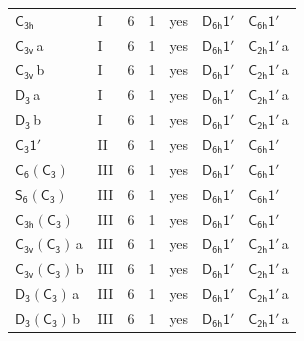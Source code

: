 \documentclass[10pt,a4paper]{article}
\numberwithin{equation}{section}
\newcommand{\grp}[1]{\mathsf{#1}}
\newcommand{\clsletter}[1]{\,{\scriptsize\color{black!55}#1}}
\begin{document}
{\begin{longtable}{@{}llrrlll@{}}
\href{../../../rotation/data/pdf/C3h.pdf}{$\grp{C_{3h}}$} & I & 6 & 1 & yes & \href{D6h-1p.pdf}{$\grp{D_{6h}1'}$} & \href{C6h-1p.pdf}{$\grp{C_{6h}1'}$}\\
\href{../../../rotation/data/pdf/C3v.pdf}{$\grp{C_{3v}}$}\clsletter{a} & I & 6 & 1 & yes & \href{D6h-1p.pdf}{$\grp{D_{6h}1'}$} & \href{C2h-1p.pdf}{$\grp{C_{2h}1'}$}\clsletter{a}\\
\href{../../../rotation/data/pdf/C3v.pdf}{$\grp{C_{3v}}$}\clsletter{b} & I & 6 & 1 & yes & \href{D6h-1p.pdf}{$\grp{D_{6h}1'}$} & \href{C2h-1p.pdf}{$\grp{C_{2h}1'}$}\clsletter{a}\\
\href{../../../rotation/data/pdf/D3.pdf}{$\grp{D_{3}}$}\clsletter{a} & I & 6 & 1 & yes & \href{D6h-1p.pdf}{$\grp{D_{6h}1'}$} & \href{C2h-1p.pdf}{$\grp{C_{2h}1'}$}\clsletter{a}\\
\href{../../../rotation/data/pdf/D3.pdf}{$\grp{D_{3}}$}\clsletter{b} & I & 6 & 1 & yes & \href{D6h-1p.pdf}{$\grp{D_{6h}1'}$} & \href{C2h-1p.pdf}{$\grp{C_{2h}1'}$}\clsletter{a}\\
\href{C3-1p.pdf}{$\grp{C_{3}1'}$} & II & 6 & 1 & yes & \href{D6h-1p.pdf}{$\grp{D_{6h}1'}$} & \href{C6h-1p.pdf}{$\grp{C_{6h}1'}$}\\
\href{C6-C3.pdf}{$\grp{C_{6}}(\grp{C_{3}})$} & III & 6 & 1 & yes & \href{D6h-1p.pdf}{$\grp{D_{6h}1'}$} & \href{C6h-1p.pdf}{$\grp{C_{6h}1'}$}\\
\href{S6-C3.pdf}{$\grp{S_{6}}(\grp{C_{3}})$} & III & 6 & 1 & yes & \href{D6h-1p.pdf}{$\grp{D_{6h}1'}$} & \href{C6h-1p.pdf}{$\grp{C_{6h}1'}$}\\
\href{C3h-C3.pdf}{$\grp{C_{3h}}(\grp{C_{3}})$} & III & 6 & 1 & yes & \href{D6h-1p.pdf}{$\grp{D_{6h}1'}$} & \href{C6h-1p.pdf}{$\grp{C_{6h}1'}$}\\
\href{C3v-C3.pdf}{$\grp{C_{3v}}(\grp{C_{3}})$}\clsletter{a} & III & 6 & 1 & yes & \href{D6h-1p.pdf}{$\grp{D_{6h}1'}$} & \href{C2h-1p.pdf}{$\grp{C_{2h}1'}$}\clsletter{a}\\
\href{C3v-C3.pdf}{$\grp{C_{3v}}(\grp{C_{3}})$}\clsletter{b} & III & 6 & 1 & yes & \href{D6h-1p.pdf}{$\grp{D_{6h}1'}$} & \href{C2h-1p.pdf}{$\grp{C_{2h}1'}$}\clsletter{a}\\
\href{D3-C3.pdf}{$\grp{D_{3}}(\grp{C_{3}})$}\clsletter{a} & III & 6 & 1 & yes & \href{D6h-1p.pdf}{$\grp{D_{6h}1'}$} & \href{C2h-1p.pdf}{$\grp{C_{2h}1'}$}\clsletter{a}\\
\href{D3-C3.pdf}{$\grp{D_{3}}(\grp{C_{3}})$}\clsletter{b} & III & 6 & 1 & yes & \href{D6h-1p.pdf}{$\grp{D_{6h}1'}$} & \href{C2h-1p.pdf}{$\grp{C_{2h}1'}$}\clsletter{a}\\

\end{longtable}}
\end{document}
